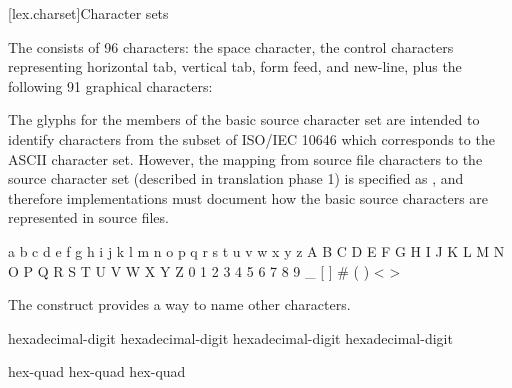 [lex.charset]{Character sets}

\pnum
{}%
The  consists of 96 characters: the space character,
the control characters representing horizontal tab, vertical tab, form feed, and
new-line, plus the following 91 graphical characters:
\begin{footnote}
The glyphs for
the members of the basic source character set are intended to
identify characters from the subset of ISO/IEC 10646 which corresponds to the ASCII
character set. However, the mapping from source file characters to the source
character set (described in translation phase 1) is specified as
,
and therefore implementations must document how the basic source characters are
represented in source files.
\end{footnote}
\begin{outputblock}
a b c d e f g h i j k l m n o p q r s t u v w x y z
A B C D E F G H I J K L M N O P Q R S T U V W X Y Z
0 1 2 3 4 5 6 7 8 9
_ { } [ ] # ( ) < > %
\end{outputblock}

\pnum
The  construct provides a way to name
other characters.

\begin{bnf}
\br
    hexadecimal-digit hexadecimal-digit hexadecimal-digit hexadecimal-digit
\end{bnf}

\begin{bnf}
\br
     hex-quad\br
     hex-quad hex-quad
\end{bnf}

